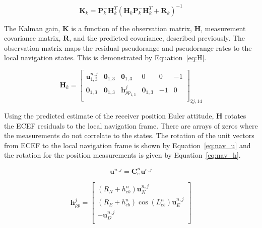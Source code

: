 \begin{equation}\label{eq:L}
    \mathbf{K}_k = \mathbf{P}^-_k \mathbf{H}^T_k\left(\mathbf{H}_k\mathbf{P}^-_k\mathbf{H}^T_k + \mathbf{R}_k\right)^{-1}
\end{equation}

The Kalman gain, \(\mathbf{K}\) is a function of the observation matrix, \(\mathbf{H}\), measurement covariance matrix, \(\mathbf{R}\), and the predicted covariance, described previously. The observation matrix maps the residual pseudorange and pseudorange rates to the local navigation states. This is demonstrated by Equation~\ref{eq:H}.

\begin{equation}\label{eq:H}
    \mathbf{H}_k = \begin{bmatrix}
        \mathbf{u}^{n,j}_{1,3} & \mathbf{0}_{1,3} & \mathbf{0}_{1,3}            & 0                & 0  & -1 \\
        \mathbf{0}_{1,3}       & \mathbf{0}_{1,3} & \mathbf{h}^j_{\rho p_{1,3}} & \mathbf{0}_{1,3} & -1 & 0  \\
    \end{bmatrix}_{2j,14}
\end{equation}

Using the predicted estimate of the receiver position Euler attitude, \(\mathbf{H}\) rotates the ECEF residuals to the local navigation frame. There are arrays of zeros where the measurements do not correlate to the states. The rotation of the unit vectors from ECEF to the local navigation frame is shown by Equation~\ref{eq:nav_u} and the rotation for the position measurements is given by Equation~\ref{eq:nav_h}.

\begin{equation}\label{eq:nav_u}
    \mathbf{u}^{n,j} = \mathbf{C}_e^n \mathbf{u}^{e,j}
\end{equation}

\begin{equation}\label{eq:nav_h}
    \mathbf{h}^j_{\rho p} =
    \begin{bmatrix}
        \left(R_N + h^n_{eb}\right)\mathbf{u}^{n,j}_N               \\
        \left(R_E + h_{eb}^n\right)\cos(L^n_{eb})\mathbf{u}^{n,j}_E \\
        -\mathbf{u}^{n,j}_D                                         \\
    \end{bmatrix}
\end{equation}

